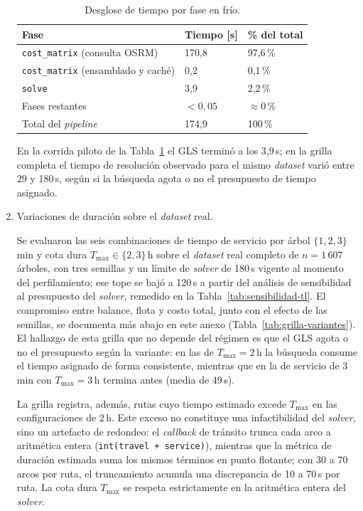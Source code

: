 \begin{enumerate}
\begin{table}[H]
  \centering
  \caption{Desglose de tiempo por fase en frío.}
  \label{tab:fases-frio}
  \begin{tabularx}{\textwidth}{lXX}
    \toprule
    Fase &
      Tiempo [s] &
      \% del total \\
    \midrule
    \texttt{cost\_matrix} (consulta OSRM) &
      170{,}8 &
      97{,}6\,\% \\
    \texttt{cost\_matrix} (ensamblado y caché) &
      0{,}2 &
      0{,}1\,\% \\
    \texttt{solve} &
      3{,}9 &
      2{,}2\,\% \\
    Fases restantes &
      $<0{,}05$ &
      $\approx 0$\,\% \\
    \midrule
    Total del \textit{pipeline} &
      174{,}9 &
      100\,\% \\
    \bottomrule
  \end{tabularx}
\end{table}

En la corrida piloto de la Tabla~\ref{tab:fases-frio} el GLS terminó a los 3,9\,s; en la grilla
completa el tiempo de resolución observado para el mismo \textit{dataset} varió entre 29 y 180\,s,
según si la búsqueda agota o no el presupuesto de tiempo asignado.

\item Variaciones de duración sobre el \textit{dataset} real.
\label{anx:variantes-duracion}

Se evaluaron las seis combinaciones de tiempo de servicio por árbol $\{1, 2, 3\}$\,min y cota dura
$T_{\max} \in \{2, 3\}$\,h sobre el \textit{dataset} real completo de $n=1\,607$ árboles, con tres
semillas y un límite de \textit{solver} de 180\,s vigente al momento del perfilamiento; ese tope se
bajó a 120\,s a partir del análisis de sensibilidad al presupuesto del \textit{solver}, remedido en
la Tabla~\ref{tab:sensibilidad-tl}. El compromiso entre balance, flota y costo total, junto con el
efecto de las semillas, se documenta más abajo en este anexo
(Tabla~\ref{tab:grilla-variantes}). El hallazgo de esta grilla que no depende del régimen es que el
GLS agota o no el presupuesto según la variante: en las de $T_{\max}=2$\,h la búsqueda consume el
tiempo asignado de forma consistente, mientras que en la de servicio de 3\,min con $T_{\max}=3$\,h
termina antes (media de 49\,s).

La grilla registra, además, rutas cuyo tiempo estimado excede $T_{\max}$ en las configuraciones de
2\,h. Este exceso no constituye una infactibilidad del \textit{solver}, sino un artefacto de
redondeo: el \textit{callback} de tránsito trunca cada arco a aritmética entera (\texttt{int(travel
+ service)}), mientras que la métrica de duración estimada suma los mismos términos en punto
flotante; con 30 a 70 arcos por ruta, el truncamiento acumula una discrepancia de 10 a 70\,s por
ruta. La cota dura $T_{\max}$ se respeta estrictamente en la aritmética entera del \textit{solver}.


\end{enumerate}
